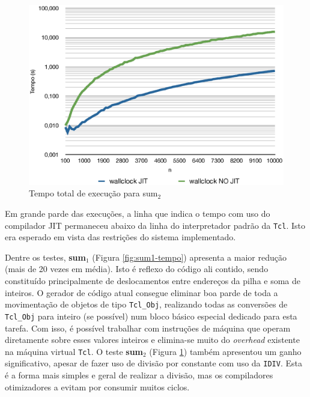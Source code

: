 \begin{figure}[ht!]
  \centering
  \includegraphics[scale=0.70]{figs/sum2_tempo}
  \caption{Tempo total de execução para sum$_2$ \label{fig:sum2-tempo}}
\end{figure}

Em grande parde das execuções, a linha que indica o tempo com uso
do compilador JIT permaneceu abaixo da linha do interpretador padrão da
\texttt{Tcl}. Isto era esperado em vista das restrições do sistema
implementado.

Dentre os testes, \textbf{sum$_1$} (Figura
\ref{fig:sum1-tempo}) apresenta a maior
redução (mais de 20 vezes em média). Isto é reflexo do código ali
contido, sendo constituído principalmente de deslocamentos entre
endereços da pilha e soma de inteiros. O gerador de código atual
consegue eliminar boa parde de toda a movimentação de objetos de tipo
\verb!Tcl_Obj!, realizando todas as conversões de \verb!Tcl_Obj! para
inteiro (se possível) num bloco básico especial dedicado para esta
tarefa.
Com isso, é possível trabalhar com instruções de máquina que operam
diretamente sobre esses valores inteiros e elimina-se muito do
\textit{overhead} existente na máquina virtual \texttt{Tcl}. O teste
\textbf{sum$_2$} (Figura \ref{fig:sum2-tempo}) também
apresentou um ganho significativo, apesar de fazer uso de divisão por
constante com uso da \verb!IDIV!. Esta é a forma mais simples e geral de
realizar a divisão, mas os compiladores otimizadores a evitam
\cite{opt-invariantintdiv} por consumir muitos ciclos.

